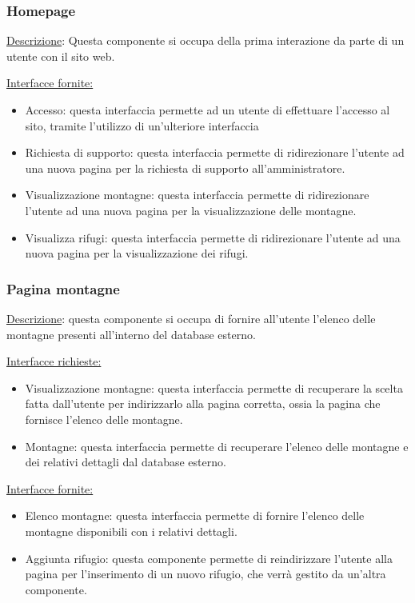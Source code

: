 \documentclass[a4paper,12pt]{article}
\begin{document}
\subsubsection{Homepage}
\underline{Descrizione}: Questa componente si occupa della prima interazione da parte di un utente con il sito web.
  
\underline{Interfacce fornite:} 
\begin{itemize}
    \item Accesso: questa interfaccia permette ad un utente di effettuare l'accesso al sito, tramite l'utilizzo di un'ulteriore interfaccia
    \item Richiesta di supporto: questa interfaccia permette di ridirezionare l'utente ad una nuova pagina per la richiesta di supporto all'amministratore.
    \item Visualizzazione montagne: questa interfaccia permette di ridirezionare l'utente ad una nuova pagina per la visualizzazione delle montagne.
    \item Visualizza rifugi: questa interfaccia permette di ridirezionare l'utente ad una nuova pagina per la visualizzazione dei rifugi.
\end{itemize}



\subsubsection{Pagina montagne}
\underline{Descrizione}: questa componente si occupa di fornire all'utente l'elenco delle montagne presenti all'interno del database esterno.

\underline{Interfacce richieste:}
\begin{itemize}
\item Visualizzazione montagne: questa interfaccia permette di recuperare la scelta fatta dall'utente per indirizzarlo alla pagina corretta, ossia la pagina che fornisce l'elenco delle montagne.
\item Montagne: questa interfaccia permette di recuperare l'elenco delle montagne e dei relativi dettagli dal database esterno.
\end{itemize}

\underline{Interfacce fornite:}
\begin{itemize}
\item Elenco montagne: questa interfaccia permette di fornire l'elenco delle montagne disponibili con i relativi dettagli.
\item Aggiunta rifugio: questa componente permette di reindirizzare l'utente alla pagina per l'inserimento di un nuovo rifugio, che verrà gestito da un'altra componente.
\end{itemize}
\end{document}
